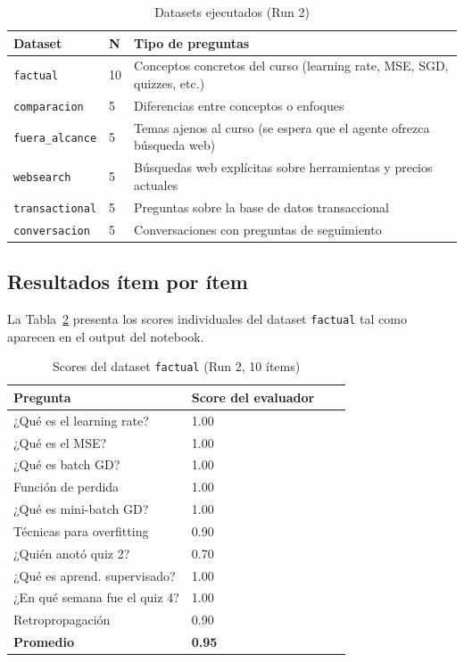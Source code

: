\documentclass[conference]{IEEEtran}
\begin{document}
\begin{table}[htbp]
\caption{Datasets ejecutados (Run 2)}
\label{tab:datasets}
\centering
\begin{tabular}{p{2.5cm}p{0.7cm}p{4.6cm}}
\toprule
\textbf{Dataset} & \textbf{N} & \textbf{Tipo de preguntas} \\
\midrule
\texttt{factual}        & 10 & Conceptos concretos del curso (learning rate, MSE, SGD, quizzes, etc.) \\
\texttt{comparacion}    & 5  & Diferencias entre conceptos o enfoques \\
\texttt{fuera\_alcance} & 5  & Temas ajenos al curso (se espera que el agente ofrezca búsqueda web) \\
\texttt{websearch}      & 5  & Búsquedas web explícitas sobre herramientas y precios actuales \\
\texttt{transactional}  & 5  & Preguntas sobre la base de datos transaccional \\
\texttt{conversacion}   & 5  & Conversaciones con preguntas de seguimiento \\
\bottomrule
\end{tabular}
\end{table}

\subsection{Resultados ítem por ítem}

La Tabla~\ref{tab:factual} presenta los scores individuales del dataset \texttt{factual} tal como aparecen en el output del notebook.

\begin{table}[htbp]
\caption{Scores del dataset \texttt{factual} (Run 2, 10 ítems)}
\label{tab:factual}
\centering
\begin{tabular}{p{3.5cm}p{3.2cm}p{1.1cm}p{1.1cm}}
\toprule
\textbf{Pregunta} & \textbf{Score del evaluador} \\
\midrule
¿Qué es el learning rate?         & 1.00 \\
¿Qué es el MSE?                   & 1.00 \\
¿Qué es batch GD?                 & 1.00 \\
Función de perdida                & 1.00 \\
¿Qué es mini-batch GD?            & 1.00 \\
Técnicas para overfitting         & 0.90 \\
¿Quién anotó quiz 2?              & 0.70 \\
¿Qué es aprend. supervisado?      & 1.00 \\
¿En qué semana fue el quiz 4?     & 1.00 \\
Retropropagación                  & 0.90 \\
\midrule
\textbf{Promedio}                 & \textbf{0.95} \\
\bottomrule
\end{tabular}
\end{table}
\end{document}
